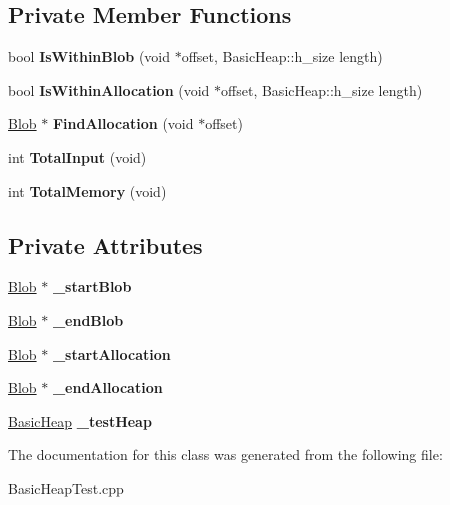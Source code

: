 \subsection*{Private Member Functions}
\begin{DoxyCompactItemize}
\item 
\mbox{\label{class_test_harness_a2a06716bb2ac9fd00ba1832b997ceb4c}} 
bool {\bfseries Is\+Within\+Blob} (void $\ast$offset, Basic\+Heap\+::h\+\_\+size length)
\item 
\mbox{\label{class_test_harness_a838879abf2382bffb49ad7504617b133}} 
bool {\bfseries Is\+Within\+Allocation} (void $\ast$offset, Basic\+Heap\+::h\+\_\+size length)
\item 
\mbox{\label{class_test_harness_a7e063d0f689a59eb18a91fb7b00b3948}} 
\hyperlink{class_test_harness_1_1_blob}{Blob} $\ast$ {\bfseries Find\+Allocation} (void $\ast$offset)
\item 
\mbox{\label{class_test_harness_a56458841a01524439b77547992d7e581}} 
int {\bfseries Total\+Input} (void)
\item 
\mbox{\label{class_test_harness_ae29d663168ef1b73bc5505cbe0b2d747}} 
int {\bfseries Total\+Memory} (void)
\end{DoxyCompactItemize}
\subsection*{Private Attributes}
\begin{DoxyCompactItemize}
\item 
\mbox{\label{class_test_harness_a7e78c7a29e05c76f1388ace2c05f140e}} 
\hyperlink{class_test_harness_1_1_blob}{Blob} $\ast$ {\bfseries \+\_\+start\+Blob}
\item 
\mbox{\label{class_test_harness_afaf5090c26780ca98223d79f423726a2}} 
\hyperlink{class_test_harness_1_1_blob}{Blob} $\ast$ {\bfseries \+\_\+end\+Blob}
\item 
\mbox{\label{class_test_harness_a29e10caebc6790c80582a9c2869ad760}} 
\hyperlink{class_test_harness_1_1_blob}{Blob} $\ast$ {\bfseries \+\_\+start\+Allocation}
\item 
\mbox{\label{class_test_harness_af7a7d72ada223d9ca0aad8834cff7f9e}} 
\hyperlink{class_test_harness_1_1_blob}{Blob} $\ast$ {\bfseries \+\_\+end\+Allocation}
\item 
\mbox{\label{class_test_harness_a21f27cb8072dd7ec494769ff9771f224}} 
\hyperlink{class_basic_heap}{Basic\+Heap} {\bfseries \+\_\+test\+Heap}
\end{DoxyCompactItemize}


The documentation for this class was generated from the following file\+:\begin{DoxyCompactItemize}
\item 
Basic\+Heap\+Test.\+cpp\end{DoxyCompactItemize}
